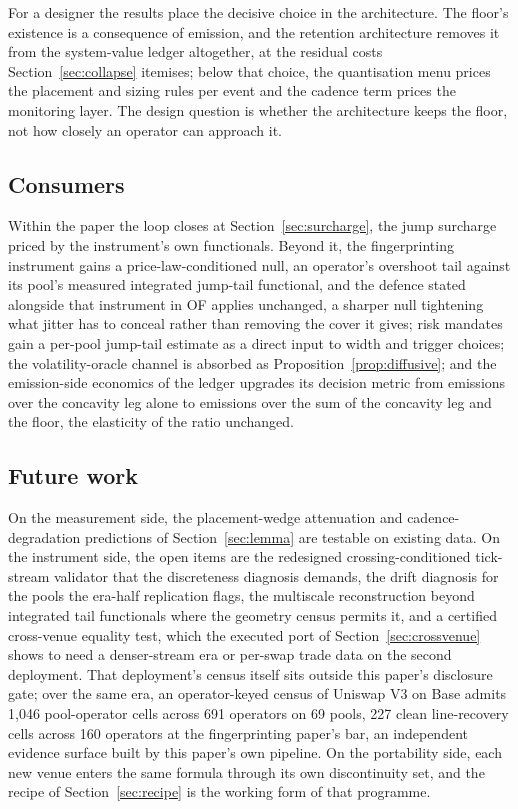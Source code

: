 \documentclass[11pt,a4paper]{article}
\theoremstyle{definition}
\theoremstyle{plain}
\theoremstyle{remark}
\begin{document}
For a designer the results place the decisive choice in the architecture. The floor's existence is a consequence of emission, and the retention architecture removes it from the system-value 
ledger altogether, at the residual costs Section~\ref{sec:collapse} itemises; below that choice, the quantisation menu prices the placement and sizing rules per event and the cadence term 
prices the monitoring layer. The design question is whether the architecture keeps the floor, not how closely an operator can approach it.

\subsection{Consumers}\label{sec:consumers}

Within the paper the loop closes at Section~\ref{sec:surcharge}, the jump surcharge priced by the instrument's own functionals. Beyond it, the fingerprinting instrument gains a 
price-law-conditioned null, an operator's overshoot tail against its pool's measured integrated jump-tail functional, and the defence stated alongside that instrument in OF applies 
unchanged, a sharper null tightening what jitter has to conceal rather than removing the cover it gives; risk mandates gain a per-pool jump-tail estimate as a direct input to width 
and trigger choices; the volatility-oracle channel is absorbed as Proposition~\ref{prop:diffusive}; and the emission-side economics of the ledger upgrades its decision metric from 
emissions over the concavity leg alone to emissions over the sum of the concavity leg and the floor, the elasticity of the ratio unchanged.\cite{ryan2026lvr}

\subsection{Future work}\label{sec:future}

On the measurement side, the placement-wedge attenuation and cadence-degradation predictions of Section~\ref{sec:lemma} are testable on existing data. On the instrument side, the 
open items are the redesigned crossing-conditioned tick-stream validator that the discreteness diagnosis demands, the drift diagnosis for the pools the era-half replication flags, 
the multiscale reconstruction beyond integrated tail functionals where the geometry census permits it, and a certified cross-venue equality test, which the executed port of 
Section~\ref{sec:crossvenue} shows to need a denser-stream era or per-swap trade data on the second deployment. That deployment's census itself sits outside this paper's disclosure 
gate; over the same era, an operator-keyed census of Uniswap V3 on Base admits 1{,}046 pool-operator cells across 691 operators on 69 pools, 227 clean line-recovery cells across 
160 operators at the fingerprinting paper's bar, an independent evidence surface built by this paper's own pipeline. On the portability side, each new venue enters the same formula 
through its own discontinuity set, and the recipe of Section~\ref{sec:recipe} is the working form of that programme.
\end{document}

